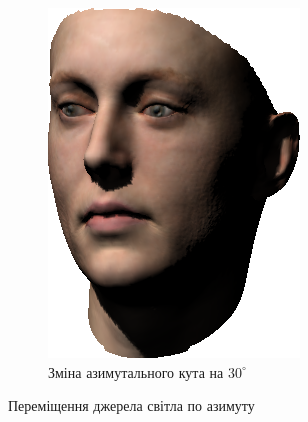 \begin{figure}[h]
\begin{subfigure}[b]{0.4\textwidth}
    \includegraphics[width=\textwidth]{images/face_shaded_2}
    \caption{Зміна азимутального кута на $30^{\circ}$}
  \end{subfigure}
  \caption{Переміщення джерела світла по азимуту}
  \label{fig:practice:shadows-angles-azimuth}
\end{figure}

